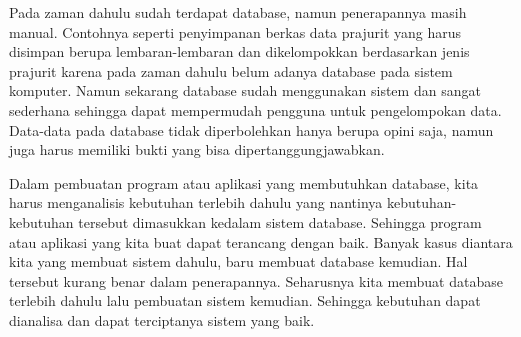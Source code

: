 \documentclass[a4paper, 12 pt]{article}
\begin{document}
	\par Pada zaman dahulu sudah terdapat database, namun penerapannya masih manual. 			Contohnya seperti penyimpanan berkas data prajurit yang harus disimpan berupa 				lembaran-lembaran dan dikelompokkan berdasarkan jenis prajurit karena pada zaman 			dahulu belum adanya database pada sistem komputer. Namun sekarang database sudah 			menggunakan sistem dan sangat sederhana sehingga dapat mempermudah pengguna untuk 			pengelompokan data. Data-data pada database tidak diperbolehkan hanya berupa opini 			saja, namun juga harus memiliki bukti yang bisa dipertanggungjawabkan. \linebreak

	\par Dalam pembuatan program atau aplikasi yang membutuhkan database, kita harus 			menganalisis kebutuhan terlebih dahulu yang nantinya kebutuhan-kebutuhan tersebut 			dimasukkan kedalam sistem database. Sehingga program atau aplikasi yang kita buat 			dapat terancang dengan baik. Banyak kasus diantara kita yang membuat sistem dahulu, 		baru membuat database kemudian. Hal tersebut kurang benar dalam penerapannya. 				Seharusnya kita membuat database terlebih dahulu lalu pembuatan sistem kemudian. 			Sehingga kebutuhan dapat dianalisa dan dapat terciptanya sistem yang baik.
\end{document}
